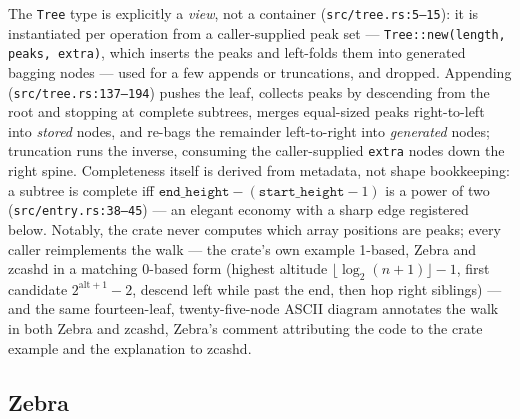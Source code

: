\documentclass[11pt,a4paper]{article}
\theoremstyle{definition}
\begin{document}
The \texttt{Tree} type is explicitly a \emph{view}, not a container
(\texttt{src/tree.rs:5--15}): it is instantiated per operation from a
caller-supplied peak set --- \texttt{Tree::new(length, peaks, extra)},
which inserts the peaks and left-folds them into generated bagging nodes
--- used for a few appends or truncations, and dropped. Appending
(\texttt{src/tree.rs:137--194}) pushes the leaf, collects peaks by
descending from the root and stopping at complete subtrees, merges
equal-sized peaks right-to-left into \emph{stored} nodes, and re-bags the
remainder left-to-right into \emph{generated} nodes; truncation runs the
inverse, consuming the caller-supplied \texttt{extra} nodes down the
right spine. Completeness itself is derived from metadata, not shape
bookkeeping: a subtree is complete iff
$\texttt{end\_height} - (\texttt{start\_height} - 1)$ is a power of two
(\texttt{src/entry.rs:38--45}) --- an elegant economy with a sharp edge
registered below. Notably, the crate never computes which array
positions are peaks; every caller reimplements the walk --- the crate's
own example 1-based, Zebra and zcashd in a matching 0-based form (highest
altitude $\lfloor \log_2(n+1) \rfloor - 1$, first candidate
$2^{\mathrm{alt}+1} - 2$, descend left while past the end, then hop
right siblings) --- and the same fourteen-leaf, twenty-five-node ASCII
diagram annotates the walk in both Zebra and zcashd, Zebra's comment
attributing the code to the crate example and the explanation to zcashd.

\subsection{Zebra}\label{sec:fc-zebra}
\end{document}
